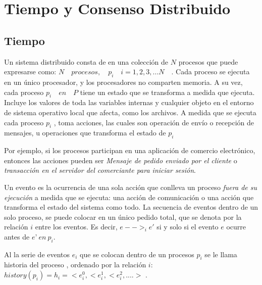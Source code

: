 \setchapterpreamble[u]{\margintoc}

\chapter{Tiempo y Consenso Distribuido}
\label{ch:Tiempo y Consenso Distribuido}

 
 \section{Tiempo}
  
 
 
   Un sistema distribuido consta \cite{Coulouris2011} de en una colección   de $N$ procesos que puede expresarse como:  $N \quad procesos,  \quad p_{i} \quad  i = 1, 2,3,... N\quad  $.
 Cada proceso se ejecuta en un único procesador, y los procesadores no comparten memoria. 
 A su vez, cada proceso $p_{i} \quad en \quad P$  tiene un estado que se transforma a medida que ejecuta.  Incluye los valores de toda las variables internas y cualquier objeto en el entorno de sistema operativo local que afecta, como los archivos. 
 A medida que se ejecuta cada proceso  $p_{i}$ , toma acciones, las cuales son operación de envío o recepción de mensajes, u operaciones que transforma el estado de $p_{i}$
 
 Por ejemplo, si los procesos participan en una aplicación de comercio electrónico, entonces las acciones  pueden ser \textit{Mensaje de pedido enviado por el cliente} o \textit{transacción en el servidor del comerciante para iniciar sesión}.	
 
 Un \gls{evento} es la ocurrencia de una sola acción que conlleva un proceso \textit{fuera de su ejecuci\'on}  a medida que se ejecuta: una acción de comunicación o una acción que transforma el estado del sistema como todo.
 La secuencia de eventos dentro de un solo proceso,  se puede colocar en un único pedido total, que se denota por la relación  $ i $ entre los eventos. Es decir, $e-->_{i}e'$  si  y  solo  si  el  evento  $e$  	ocurre antes de $e’ \ en \ p_{i}$. 
 
Al la serie de eventos $e_{i}$  que se colocan dentro de un procesos $p_{i}$ se le llama \gls{historia del proceso}  , ordenado  por la relación ${i}:$ \\  $history(p_{i})  = h_{i}  = <e_{i}^{0},  <e_{i}^{1},  <e_{i}^{2}, ....>  $ .

